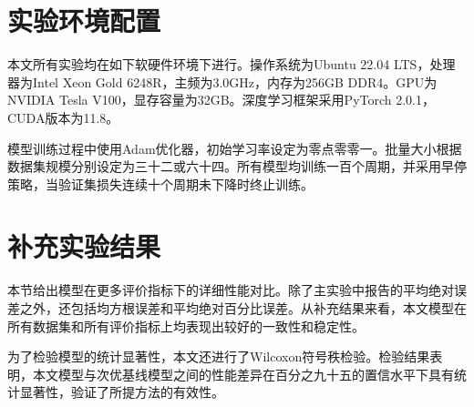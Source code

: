 \documentclass[12pt,a4paper,twoside]{ctexbook}
\begin{document}
\appendix

\chapter{实验环境配置}
本文所有实验均在如下软硬件环境下进行。操作系统为Ubuntu 22.04 LTS，处理器为Intel Xeon Gold 6248R，主频为3.0GHz，内存为256GB DDR4。GPU为NVIDIA Tesla V100，显存容量为32GB。深度学习框架采用PyTorch 2.0.1，CUDA版本为11.8。

模型训练过程中使用Adam优化器，初始学习率设定为零点零零一。批量大小根据数据集规模分别设定为三十二或六十四。所有模型均训练一百个周期，并采用早停策略，当验证集损失连续十个周期未下降时终止训练。

\chapter{补充实验结果}
本节给出模型在更多评价指标下的详细性能对比。除了主实验中报告的平均绝对误差之外，还包括均方根误差和平均绝对百分比误差。从补充结果来看，本文模型在所有数据集和所有评价指标上均表现出较好的一致性和稳定性。

为了检验模型的统计显著性，本文还进行了Wilcoxon符号秩检验。检验结果表明，本文模型与次优基线模型之间的性能差异在百分之九十五的置信水平下具有统计显著性，验证了所提方法的有效性。

\end{document}
